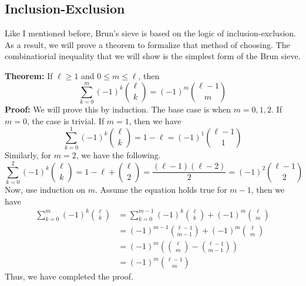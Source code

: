 \documentclass[8pt]{extarticle}
\begin{document}
\subsection{Inclusion-Exclusion}
Like I mentioned before, Brun's sieve is based on the logic of inclusion-exclusion. As a result, we will prove a theorem to formalize that method of choosing. The combinatiorial inequality that we will show is the simplest form of the Brun sieve.
\begin{boxedsection}
\textbf{Theorem:} If $\ell \geq 1$ and $0 \leq m \leq \ell$, then
$$
\sum_{k=0}^m (-1)^k {\ell \choose k}  = (-1)^m {\ell - 1 \choose m}
$$
\textbf{Proof:} We will prove this by induction. The base case is when $m = 0,1,2$. If $m = 0$, the case is trivial. If $m = 1$, then we have 
$$
\sum_{k=0}^1 (-1)^k {\ell \choose k} = 1 - \ell = (-1)^1 {\ell - 1 \choose 1}
$$
Similarly, for $m = 2$, we have the following.
$$
\sum_{k=0}^2 (-1)^k {\ell \choose k} = 1 - \ell + {\ell \choose 2} = \frac{(\ell-1)(\ell -2)}{2} = (-1)^2 {\ell - 1 \choose 2}
$$
Now, use induction on $m$. Assume the equation holds true for $m-1$, then we have
\begin{align*}
    \sum_{k=0}^m (-1)^k {\ell \choose k} &= \sum_{k=0}^{m-1} (-1)^k {\ell \choose k} + (-1)^m {\ell \choose m}\\
    &= (-1)^{m-1} {\ell - 1 \choose m-1} + (-1)^m {\ell \choose m}\\
    &= (-1)^m \left({\ell \choose m} - {\ell - 1 \choose m-1}\right)\\
    &= (-1)^m {\ell - 1 \choose m}
\end{align*}
Thus, we have completed the proof.
\end{boxedsection}
\end{document}
